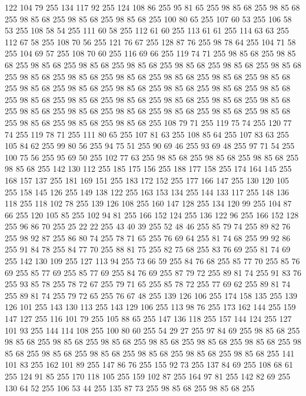 122 104 79 255 134 117 92 255 124 108 86 255 95 81 65 255 98 85 68 255 98 85 68 255 98 85 68 255 98 85 68 255 98 85 68 255 100 80 65 255 107 60 53 255 106 58 53 255 108 58 54 255 111 60 58 255 112 61 60 255 113 61 61 255 114 63 63 255 112 67 58 255 108 70 56 255 121 76 67 255 128 87 76 255 98 78 64 255 104 71 58 255 104 69 57 255 108 70 60 255 116 69 66 255 119 74 71 255 98 85 68 255 98 85 68 255 98 85 68 255 98 85 68 255 98 85 68 255 98 85 68 255 98 85 68 255 98 85 68 255 98 85 68 255 98 85 68 255 98 85 68 255 98 85 68 255 98 85 68 255 98 85 68 255 98 85 68 255 98 85 68 255 98 85 68 255 98 85 68 255 98 85 68 255 98 85 68 255 98 85 68 255 98 85 68 255 98 85 68 255 98 85 68 255 98 85 68 255 98 85 68 255 98 85 68 255 98 85 68 255 98 85 68 255 98 85 68 255 98 85 68 255 98 85 68 255 98 85 68 255 98 85 68 255 98 85 68 255 108 79 71 255 119 75 74 255
120 77 74 255 119 78 71 255 111 80 65 255 107 81 63 255 108 85 64 255 107 83 63 255 105 84 62 255 99 80 56 255 94 75 51 255 90 69 46 255 93 69 48 255 97 71 54 255 100 75 56 255 95 69 50 255 102 77 63 255 98 85 68 255 98 85 68 255 98 85 68 255 98 85 68 255 142 130 112 255 185 175 156 255 188 177 158 255 174 164 145 255 168 157 137 255 181 169 151 255 183 172 152 255 177 166 147 255 130 120 105 255 158 145 126 255 149 138 122 255 163 153 134 255 144 133 117 255 148 136 118 255 118 102 78 255 139 126 108 255 160 147 128 255 134 120 99 255 104 87 66 255 120 105 85 255 102 94 81 255 166 152 124 255 136 122 96 255 166 152 128 255 96 86 70 255 25 22 22 255 43 40 39 255 52 48 46 255 85 79 74 255 89 82 76 255 98 92 87 255 86 80 74 255 78 71 65 255 76 69 64 255 81 74 68 255 99 92 86 255 91 84 78 255 84 77 70 255 88 81 75 255 82 75 68 255 83 76 69 255 81 74 69 255 142 130 109 255 127 113 94 255 73 66 59 255
84 76 68 255 85 77 70 255 85 76 69 255 85 77 69 255 85 77 69 255 84 76 69 255 87 79 72 255 89 81 74 255 91 83 76 255 93 85 78 255 78 72 67 255 79 71 65 255 85 78 72 255 77 69 62 255 89 81 74 255 89 81 74 255 79 72 65 255 76 67 48 255 139 126 106 255 174 158 135 255 139 126 101 255 143 130 113 255 143 129 106 255 113 98 76 255 173 162 144 255 159 147 127 255 116 101 79 255 105 88 65 255 147 136 118 255 157 144 124 255 127 101 93 255 144 114 108 255 100 80 60 255 54 29 27 255 97 84 69 255 98 85 68 255 98 85 68 255 98 85 68 255 98 85 68 255 98 85 68 255 98 85 68 255 98 85 68 255 98 85 68 255 98 85 68 255 98 85 68 255 98 85 68 255 98 85 68 255 98 85 68 255 141 101 83 255 162 101 89 255 147 86 76 255 155 92 73 255 137 84 69 255 108 68 61 255 124 91 85 255 170 118 105 255 159 102 87 255 164 97 81 255 142 82 69 255 130 64 52 255 106 53 44 255 135 87 73 255 98 85 68 255 98 85 68 255
